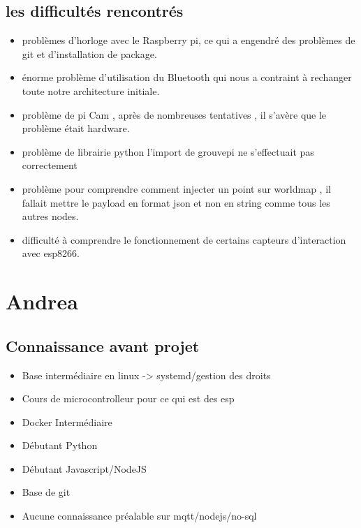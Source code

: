 \subsection{les difficultés rencontrés}
\begin{itemize}
    \item problèmes d'horloge avec le Raspberry pi, ce qui a engendré des problèmes de git et d'installation de package.
    \item énorme problème d'utilisation du Bluetooth qui nous a contraint à rechanger toute notre architecture initiale. 
    \item problème de pi Cam , après de nombreuses tentatives , il s'avère que le problème était hardware.
    \item problème de librairie python l'import de grouvepi ne s'effectuait pas correctement
    \item problème pour comprendre comment injecter un point sur worldmap , il fallait mettre le payload en format json et non en string comme tous les autres nodes.
    \item difficulté à comprendre le fonctionnement de certains capteurs
     d'interaction avec esp8266.
    

 \end{itemize}
\section{Andrea}
\subsection{ Connaissance avant projet }
    \begin{itemize}
        \item Base intermédiaire en linux -> systemd/gestion des droits
        \item Cours de microcontrolleur pour ce qui est des esp
        \item Docker Intermédiaire
        \item Débutant Python
        \item Débutant Javascript/NodeJS
        \item Base de git
        \item Aucune connaissance préalable sur mqtt/nodejs/no-sql
    \end{itemize}
